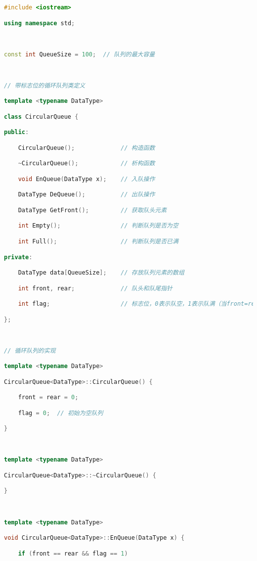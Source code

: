 \begin{lstlisting}[language=C++]
#include <iostream>

using namespace std;

  

const int QueueSize = 100;  // 队列的最大容量

  

// 带标志位的循环队列类定义

template <typename DataType>

class CircularQueue {

public:

    CircularQueue();             // 构造函数

    ~CircularQueue();            // 析构函数

    void EnQueue(DataType x);    // 入队操作

    DataType DeQueue();          // 出队操作

    DataType GetFront();         // 获取队头元素

    int Empty();                 // 判断队列是否为空

    int Full();                  // 判断队列是否已满

private:

    DataType data[QueueSize];    // 存放队列元素的数组

    int front, rear;             // 队头和队尾指针

    int flag;                    // 标志位，0表示队空，1表示队满（当front=rear时）

};

  

// 循环队列的实现

template <typename DataType>

CircularQueue<DataType>::CircularQueue() {

    front = rear = 0;

    flag = 0;  // 初始为空队列

}

  

template <typename DataType>

CircularQueue<DataType>::~CircularQueue() {

}

  

template <typename DataType>

void CircularQueue<DataType>::EnQueue(DataType x) {

    if (front == rear && flag == 1)


\end{lstlisting}
